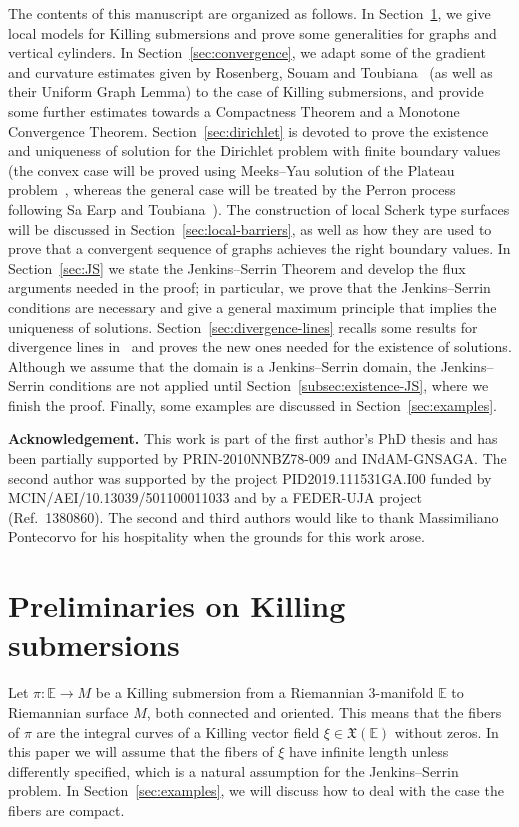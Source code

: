 \documentclass[a4paper,10pt,reqno]{amsart}
\newcommand{\E}{\mathbb{E}}
\newcommand{\X}{\mathfrak{X}}
\theoremstyle{definition}
\theoremstyle{remark}
\numberwithin{equation}{section}
\begin{document}
The contents of this manuscript are organized as follows. In Section~\ref{sec:killing}, we give local models for Killing submersions and prove some generalities for graphs and vertical cylinders. In Section~\ref{sec:convergence}, we adapt some of the gradient and curvature estimates given by Rosenberg, Souam and Toubiana~\cite{RST} (as well as their Uniform Graph Lemma) to the case of Killing submersions, and provide some further estimates towards a Compactness Theorem and a Monotone Convergence Theorem. Section~\ref{sec:dirichlet} is devoted to prove the existence and uniqueness of solution for the Dirichlet problem with finite boundary values (the convex case will be proved using Meeks--Yau solution of the Plateau problem~\cite{MY1}, whereas the general case will be treated by the Perron process following Sa Earp and Toubiana~\cite{ST1,ST3}). The construction of local Scherk type surfaces will be discussed in Section~\ref{sec:local-barriers}, as well as how they are used to prove that a convergent sequence of graphs achieves the right boundary values. In Section~\ref{sec:JS} we state the Jenkins--Serrin Theorem and develop the flux arguments needed in the proof; in particular, we prove that the Jenkins--Serrin conditions are necessary and give a general maximum principle that implies the uniqueness of solutions. Section~\ref{sec:divergence-lines} recalls some results for divergence lines in~\cite{MRR} and proves the new ones needed for the existence of solutions. Although we assume that the domain is a Jenkins--Serrin domain, the Jenkins--Serrin conditions are not applied until Section~\ref{subsec:existence-JS}, where we finish the proof. Finally, some examples are discussed in Section~\ref{sec:examples}.
		
\medskip	
\noindent\textbf{Acknowledgement.} This work is part of the first author's PhD thesis and has been partially supported by PRIN-2010NNBZ78-009 and INdAM-GNSAGA. The second author was supported by the project PID2019.111531GA.I00 funded by MCIN/AEI/10.13039/501100011033 and by a FEDER-UJA project (Ref.\ 1380860). The second and third authors would like to thank Massimiliano Pontecorvo for his hospitality when the grounds for this work arose.


	
\section{Preliminaries on Killing submersions}\label{sec:killing}

Let $\pi:\E\to M$ be a Killing submersion from a Riemannian 3-manifold $\E$ to Riemannian surface $M$, both connected and oriented. This means that the fibers of $\pi$ are the integral curves of a Killing vector field $\xi\in\X(\E)$ without zeros. In this paper we will assume that the fibers of $\xi$ have infinite length unless differently specified, which is a natural assumption for the Jenkins--Serrin problem. In Section~\ref{sec:examples}, we will discuss how to deal with the case the fibers are compact.
\end{document}
